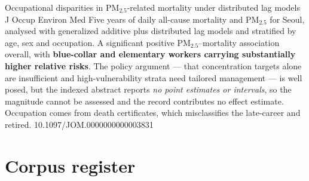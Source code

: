 \documentclass[10pt]{article}
\begin{document}
\enlargethispage{3\baselineskip}
{Occupational disparities in PM$_{2.5}$-related mortality under distributed lag models}
{J Occup Environ Med}
{Five years of daily all-cause mortality and PM$_{2.5}$ for Seoul, analysed with
generalized additive plus distributed lag models and stratified by age, sex and
occupation. A significant positive PM$_{2.5}$--mortality association overall, with
\textbf{blue-collar and elementary workers carrying substantially higher relative risks}.
The policy argument --- that concentration targets alone are insufficient and
high-vulnerability strata need tailored management --- is well posed, but the indexed
abstract reports \emph{no point estimates or intervals}, so the magnitude cannot be
assessed and the record contributes no effect estimate. Occupation comes from death
certificates, which misclassifies the late-career and retired.}
{10.1097/JOM.0000000000003831}

\clearpage

\section*{\sffamily\bfseries\color{Deep}Corpus register}
\vspace{-1.5mm}{\color{Amber}\rule{\linewidth}{1.1pt}}\vspace{2.5mm}


\end{document}
